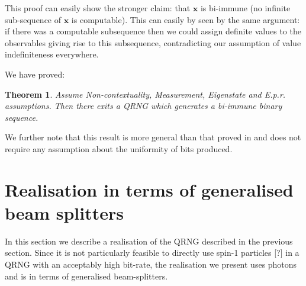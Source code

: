\documentclass[11pt, a4paper]{article}
\newtheorem{Theorem}{Theorem}
\theoremstyle{definition}
\newcommand{\seq}[1]{\mathbf{#1}}
\begin{document}
This proof can easily show the stronger claim: that $\seq{x}$ is bi-immune (no infinite sub-sequence of $\seq{x}$ is computable).
This can easily by seen by the same argument: if there was a computable subsequence then we could assign definite values to the observables giving rise to this subsequence, contradicting our assumption of value indefiniteness everywhere.



We have proved:\\

\begin{Theorem} Assume Non-contextuality, Measurement, Eigenstate and E.p.r. assumptions.  Then there exits a QRNG which generates a bi-immune binary sequence.
\end{Theorem}

We further note that this result is more general than that proved in \cite{} and does not require any assumption about the uniformity of bits produced.



\section{Realisation in terms of generalised beam splitters}
\label{sec:experiment}

In this section we describe a realisation of the QRNG described in the previous section.
Since it is not particularly feasible to directly use spin-1 particles [?] in a QRNG with an acceptably high bit-rate, the realisation we present uses photons and is in terms of generalised beam-splitters.
\end{document}
